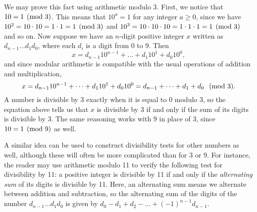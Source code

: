 We may prove this fact using arithmetic modulo 3.
First, we notice that $10 = 1 \hspace{.15cm} \text{(mod 3)}$.  
This means that $10^a = 1$ for any integer $a \geq 0$, since we have $10^2 = 10 \cdot 10 = 1 \cdot 1 = 1 \hspace{.15cm} \text{(mod 3)}$ and $10^3 = 10 \cdot 10 \cdot 10 = 1 \cdot 1 \cdot 1 = 1 \hspace{.15cm} \text{(mod 3)}$ and so on.
Now suppose we have an $n$-digit positive integer $x$ written as $d_{n-1} \dots d_1 d_0$, where each $d_i$ is a digit from 0 to 9.
Then 
\[x = d_{n-1}10^{n-1} + \dots + d_1 10^1 + d_0 10^0,\]
and since modular arithmetic is compatible with the usual operations of addition and multiplication,
\[x = d_{n-1}10^{n-1} + \dots + d_1 10^1 + d_0 10^0 = d_{n-1}+ \dots + d_1  + d_0 \hspace{.25cm} \text{(mod 3)}.\]
A number is divisible by 3 exactly when it is equal to 0 modulo 3, so the equation above tells us that $x$ is divisible by 3 if and only if the sum of its digits is divisible by 3.
The same reasoning works with 9 in place of 3, since $10 = 1\hspace{.15cm} \text{(mod 9)}$ as well.

A similar idea can be used to construct divisibility tests for other numbers as well, although these will often be more complicated than for 3 or 9.
For instance, the reader may use arithmetic modulo 11 to verify the following test for divisibility by 11: a positive integer is divisible by 11 if and only if the \textit{alternating sum} of its digits is divisible by 11. 
Here, an alternating sum means we alternate between addition and subtraction, so the alternating sum of the digits of the number $d_{n-1} \dots d_1 d_0$ is given by $d_0 - d_1 + d_2 - \dots + (-1)^{n-1} d_{n-1}$.
